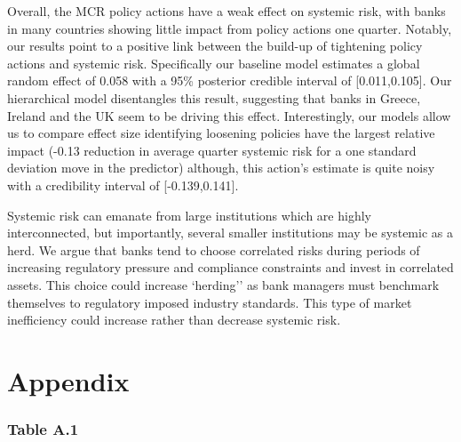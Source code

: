 \documentclass[
  10pt,
]{article}
\begin{document}
Overall, the MCR policy actions have a weak effect on systemic risk,
with banks in many countries showing little impact from policy actions
one quarter. Notably, our results point to a positive link between the
build-up of tightening policy actions and systemic risk. Specifically
our baseline model estimates a global random effect of 0.058 with a 95\%
posterior credible interval of {[}0.011,0.105{]}. Our hierarchical model
disentangles this result, suggesting that banks in Greece, Ireland and
the UK seem to be driving this effect. Interestingly, our models allow
us to compare effect size identifying loosening policies have the
largest relative impact (-0.13 reduction in average quarter systemic
risk for a one standard deviation move in the predictor) although, this
action's estimate is quite noisy with a credibility interval of
{[}-0.139,0.141{]}.

Systemic risk can emanate from large institutions which are highly
interconnected, but importantly, several smaller institutions may be
systemic as a herd. We argue that banks tend to choose correlated risks
during periods of increasing regulatory pressure and compliance
constraints and invest in correlated assets. This choice could increase
`herding'' as bank managers must benchmark themselves to regulatory
imposed industry standards. This type of market inefficiency could
increase rather than decrease systemic risk.

\hypertarget{appendix}{%
\section{Appendix}\label{appendix}}

\hypertarget{table-a.1}{%
\subsubsection{Table A.1}\label{table-a.1}}
\end{document}
